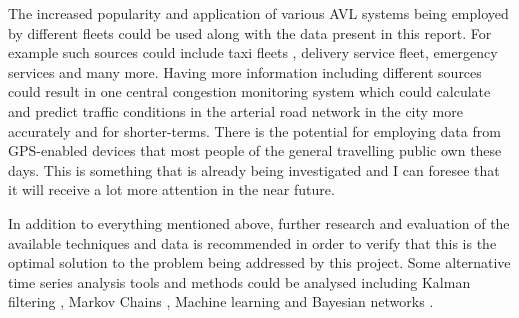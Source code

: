 The increased popularity and application of various AVL systems being employed by different fleets could be used along with the data present in this report. For example such sources could include taxi fleets \cite{rahmani2010requirements}, delivery service fleet, emergency services and many more. Having more information including different sources could result in one central congestion monitoring system which could calculate and predict traffic conditions in the arterial road network in the city more accurately and for shorter-terms. There is the potential for employing data from GPS-enabled devices that most people of the general travelling public own these days. This is something that is already being investigated \cite{thiagarajan2010cooperative} and I can foresee that it will receive a lot more attention in the near future.

In addition to everything mentioned above, further research and evaluation of the available techniques and data is recommended in order to verify that this is the optimal solution to the problem being addressed by this project. Some alternative time series analysis tools and methods could be analysed including Kalman filtering \cite{kalmanFiltering} \cite{Guo201450}, Markov Chains \cite{Qi201495} \cite{Ramezani20121576}, Machine learning \cite{herring2010real} and Bayesian networks \cite{Wang201479}.




